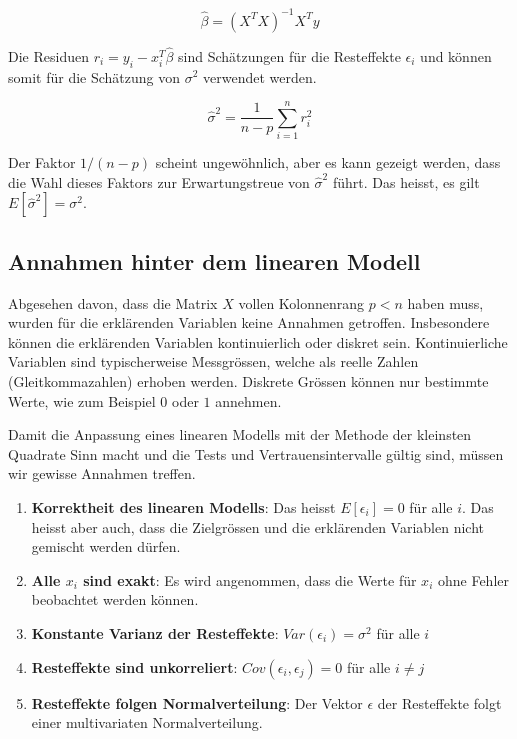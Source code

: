 \documentclass[]{book}
\providecommand{\tightlist}{%
  \setlength{\itemsep}{0pt}\setlength{\parskip}{0pt}}
\begin{document}
\begin{equation}\hat{\beta} = (X^TX)^{-1}X^Ty\end{equation}

Die Residuen \(r_i = y_i - x_i^T\hat{\beta}\) sind Schätzungen für die
Resteffekte \(\epsilon_i\) und können somit für die Schätzung von
\(\sigma^2\) verwendet werden.

\begin{equation}\hat{\sigma}^2 = \frac{1}{n-p}\sum_{i=1}^{n} r_i^2\end{equation}

Der Faktor \(1/(n-p)\) scheint ungewöhnlich, aber es kann gezeigt
werden, dass die Wahl dieses Faktors zur Erwartungstreue von
\(\hat{\sigma}^2\) führt. Das heisst, es gilt
\(E\left[ \hat{\sigma}^2 \right] = \sigma^2\).

\subsection{Annahmen hinter dem linearen
Modell}\label{annahmen-hinter-dem-linearen-modell}

Abgesehen davon, dass die Matrix \(X\) vollen Kolonnenrang \(p<n\) haben
muss, wurden für die erklärenden Variablen keine Annahmen getroffen.
Insbesondere können die erklärenden Variablen kontinuierlich oder
diskret sein. Kontinuierliche Variablen sind typischerweise Messgrössen,
welche als reelle Zahlen (Gleitkommazahlen) erhoben werden. Diskrete
Grössen können nur bestimmte Werte, wie zum Beispiel \(0\) oder \(1\)
annehmen.

Damit die Anpassung eines linearen Modells mit der Methode der kleinsten
Quadrate Sinn macht und die Tests und Vertrauensintervalle gültig sind,
müssen wir gewisse Annahmen treffen.

\begin{enumerate}
\def\labelenumi{\arabic{enumi}.}
\tightlist
\item
  \textbf{Korrektheit des linearen Modells}: Das heisst
  \(E\left[\epsilon_i \right] = 0\) für alle \(i\). Das heisst aber
  auch, dass die Zielgrössen und die erklärenden Variablen nicht
  gemischt werden dürfen.
\item
  \textbf{Alle \(x_i\) sind exakt}: Es wird angenommen, dass die Werte
  für \(x_i\) ohne Fehler beobachtet werden können.
\item
  \textbf{Konstante Varianz der Resteffekte}:
  \(Var(\epsilon_i) = \sigma^2\) für alle \(i\)
\item
  \textbf{Resteffekte sind unkorreliert}:
  \(Cov(\epsilon_i, \epsilon_j) = 0\) für alle \(i\ne j\)
\item
  \textbf{Resteffekte folgen Normalverteilung}: Der Vektor \(\epsilon\)
  der Resteffekte folgt einer multivariaten Normalverteilung.
\end{enumerate}
\end{document}
